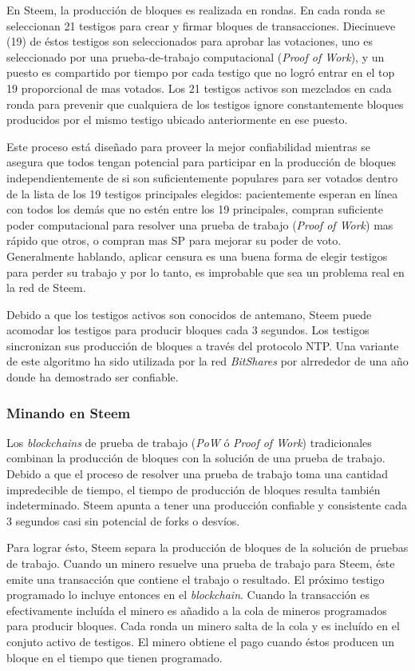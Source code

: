 \documentclass[a4paper,titlepage,final]{article}
\begin{document}
En Steem, la producción de bloques es realizada en rondas. En cada ronda se seleccionan 21 testigos para crear y firmar bloques de transacciones. Diecinueve (19) de éstos testigos son seleccionados para aprobar las votaciones, uno es seleccionado por una prueba-de-trabajo computacional (\textit{Proof of Work}), y un puesto es compartido por tiempo por cada testigo que no logró entrar en el top 19 proporcional de mas votados. Los 21 testigos activos son mezclados en cada ronda para prevenir que cualquiera de los testigos ignore constantemente bloques producidos por el mismo testigo ubicado anteriormente en ese puesto.

Este proceso está diseñado para proveer la mejor confiabilidad mientras se asegura que todos tengan potencial para participar en la producción de bloques independientemente de si son suficientemente populares para ser votados dentro de la lista de los 19 testigos principales elegidos: pacientemente esperan en línea con todos los demás que no estén entre los 19 principales, compran suficiente poder computacional para resolver una prueba de trabajo (\textit{Proof of Work}) mas rápido que otros, o compran mas SP para mejorar su poder de voto. Generalmente hablando, aplicar censura es una buena forma de elegir testigos para perder su trabajo y por lo tanto, es improbable que sea un problema real en la red de Steem.

Debido a que los testigos activos son conocidos de antemano, Steem puede acomodar los testigos para producir bloques cada 3 segundos. Los testigos sincronizan sus producción de bloques a través del protocolo NTP. Una variante de este algoritmo ha sido utilizada por la red \textit{BitShares} por alrrededor de una año donde ha demostrado ser confiable.

\subsubsection{Minando en Steem}

Los \textit{blockchains} de prueba de trabajo (\textit{PoW }ó \textit{Proof of Work}) tradicionales combinan la producción de bloques con la solución de una prueba de trabajo. Debido a que el proceso de resolver una prueba de trabajo toma una cantidad impredecible de tiempo, el tiempo de producción de bloques resulta también indeterminado. Steem apunta a tener una producción confiable y consistente cada 3 segundos casi sin potencial de forks o desvíos.

Para lograr ésto, Steem separa la producción de bloques de la solución de pruebas de trabajo. Cuando un minero resuelve una prueba de trabajo para Steem, éste emite una transacción que contiene el trabajo o resultado. El próximo testigo programado lo incluye entonces en el \textit{blockchain}. Cuando la transacción es efectivamente incluída el minero es añadido a la cola de mineros programados para producir bloques. Cada ronda un minero salta de la cola y es incluído en el conjuto activo de testigos. El minero obtiene el pago cuando éstos producen un bloque en el tiempo que tienen programado.
\end{document}
